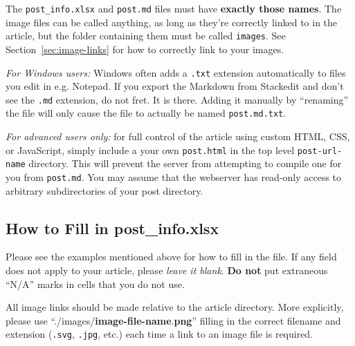 \documentclass[paper=a4, fontsize=11pt]{scrartcl}
\numberwithin{equation}{section}        %
\numberwithin{figure}{section}            %
\numberwithin{table}{section}                %
\begin{document}
The \texttt{post\_info.xlsx} and \texttt{post.md} files must have
\textbf{exactly those names}. The image files can be called anything, as long as
they're correctly linked to in the article, but the
folder containing them must be called \texttt{images}. See Section~\ref{sec:image-links}
for how to correctly link to your images.

\emph{For Windows users:} Windows often adds a \texttt{.txt} extension
automatically to files you edit in e.g. Notepad. If you export the Markdown from
Stackedit and don't see the \texttt{.md} extension, do not fret. It is there.
Adding it manually by ``renaming'' the file will only cause the file to actually
be named \texttt{post.md.txt}.

\emph{For advanced users only:} for full control of the article using custom
HTML, CSS, or JavaScript, simply include a your own \texttt{post.html} in
the top level \texttt{post-url-name} directory. This will
prevent the server from attempting to compile one for you from \texttt{post.md}.
You may assume that the webserver has read-only access to arbitrary
subdirectories of your post directory.

\subsection{How to Fill in post\_info.xlsx}\label{sec:excel}
Please see the examples mentioned above for how to fill in the file. If any
field does not apply to your article, please \textit{leave it blank}. \textbf{Do
not} put extraneous ``N/A'' marks in cells that you do not use.

All image links should be made relative to the article
directory. More explicitly, please use
``./images/\textbf{image-file-name}.\textbf{png}''
filling in the correct filename and extension (\texttt{.svg}, \texttt{.jpg},
etc.) each time a link to an image file is required.
\end{document}
